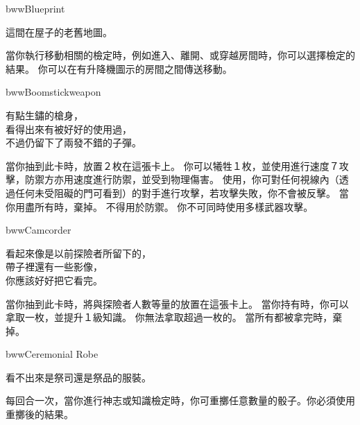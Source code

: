 %
\begin{ItemCard}{bww}{Blueprint}{}
  \begin{CardStory}
    這間在屋子的老舊地圖。
  \end{CardStory}
  當你執行移動相關的檢定時，例如進入、離開、或穿越房間時，你可以選擇檢定的結果。\smallbreak
  你可以在有升降機圖示的房間之間傳送移動。\smallbreak
\end{ItemCard}%
\linebreak[0]%
\begin{ItemCard}{bww}{Boomstick}{weapon}
  \begin{CardStory}
    有點生鏽的槍身，\\
    看得出來有被好好的使用過，\\
    不過仍留下了兩發不錯的子彈。
  \end{CardStory}
  當你抽到此卡時，放置２枚在這張卡上。\smallbreak
  你可以犧牲１枚，並使用\ThisName{}進行速度７攻擊，防禦方亦用速度進行防禦，並受到物理傷害。\smallbreak
  使用\ThisName{}，你可對任何視線內（透過任何未受阻礙的門可看到）的對手進行攻擊，若攻擊失敗，你不會被反擊。\smallbreak
  當你用盡所有時，棄掉\ThisName{}。\smallbreak
  \ThisName{}不得用於防禦。\smallbreak
  你不可同時使用多樣武器攻擊。\smallbreak
\end{ItemCard}%
\linebreak[0]%
\begin{ItemCard}{bww}{Camcorder}{}
  \begin{CardStory}
    看起來像是以前探險者所留下的，\\
    帶子裡還有一些影像，\\
    你應該好好把它看完。
  \end{CardStory}
  當你抽到此卡時，將與探險者人數等量的放置在這張卡上。\smallbreak
  當你持有\ThisName{}時，你可以拿取一枚，並提升１級知識。\smallbreak
  你無法拿取超過一枚的。\smallbreak
  當所有都被拿完時，棄掉\ThisName{}。\smallbreak
\end{ItemCard}%
\linebreak[0]%
\begin{ItemCard}{bww}{Ceremonial Robe}{}
  \begin{CardStory}
    看不出來是祭司還是祭品的服裝。
  \end{CardStory}
  每回合一次，當你進行神志或知識檢定時，你可重擲任意數量的骰子。你必須使用重擲後的結果。\smallbreak
\end{ItemCard}%
